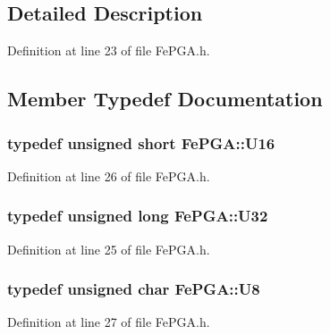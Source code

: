 \subsection{Detailed Description}


Definition at line 23 of file FePGA.h.

\subsection{Member Typedef Documentation}
\hypertarget{classFePGA_ac84b20a342a6c963cba061c8bdc37651}{
\subsubsection[{U16}]{\setlength{\rightskip}{0pt plus 5cm}typedef unsigned short {\bf FePGA::U16}}}
\label{classFePGA_ac84b20a342a6c963cba061c8bdc37651}


Definition at line 26 of file FePGA.h.\hypertarget{classFePGA_a1d44a0b27d13179bb1dceb5ec6f4cc1f}{
\subsubsection[{U32}]{\setlength{\rightskip}{0pt plus 5cm}typedef unsigned long {\bf FePGA::U32}}}
\label{classFePGA_a1d44a0b27d13179bb1dceb5ec6f4cc1f}


Definition at line 25 of file FePGA.h.\hypertarget{classFePGA_ab65d84dbbc4b5711eb4d85d00c5abfa2}{
\subsubsection[{U8}]{\setlength{\rightskip}{0pt plus 5cm}typedef unsigned char {\bf FePGA::U8}}}
\label{classFePGA_ab65d84dbbc4b5711eb4d85d00c5abfa2}


Definition at line 27 of file FePGA.h.

